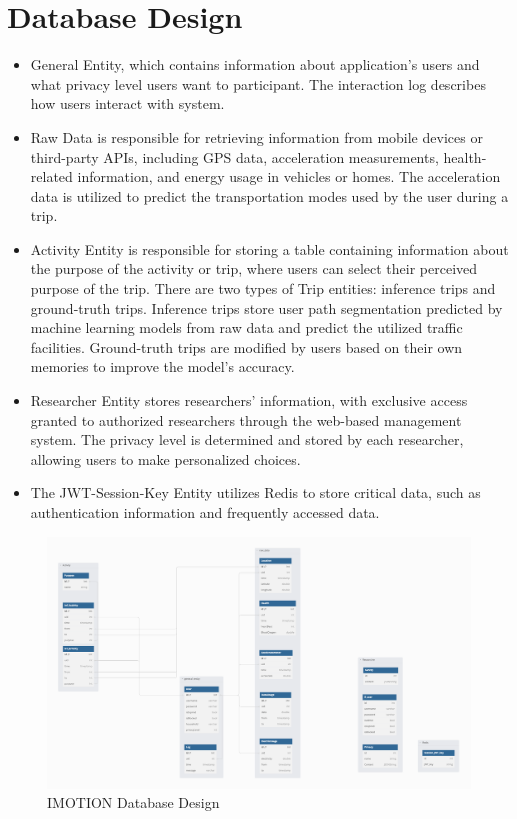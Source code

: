 \documentclass[12pt,two side]{report}
\begin{document}
\section{Database Design}
\begin{itemize}
    \item General Entity, which contains information about application's users and what privacy level users want to participant. The interaction log describes how users interact with system.
    \item Raw Data is responsible for retrieving information from mobile devices or third-party APIs, including GPS data, acceleration measurements, health-related information, and energy usage in vehicles or homes. The acceleration data is utilized to predict the transportation modes used by the user during a trip.
    \item Activity Entity is responsible for storing a table containing information about the purpose of the activity or trip, where users can select their perceived purpose of the trip. There are two types of Trip entities: inference trips and ground-truth trips. Inference trips store user path segmentation predicted by machine learning models from raw data and predict the utilized traffic facilities. Ground-truth trips are modified by users based on their own memories to improve the model's accuracy.
    \item Researcher Entity stores researchers' information, with exclusive access granted to authorized researchers through the web-based management system. The privacy level is determined and stored by each researcher, allowing users to make personalized choices.
    \item The JWT-Session-Key Entity utilizes Redis to store critical data, such as authentication information and frequently accessed data.
\end{itemize}
\begin{figure}
\centering
\includegraphics[width=16cm]{background_report/figures/database.png}
\caption{IMOTION Database Design}
\label{figure:6}
\end{figure}
\end{document}
